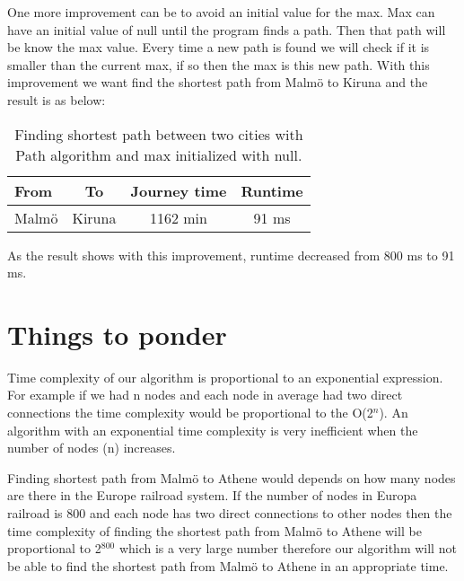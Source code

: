 \documentclass[a4paper,11pt]{article}
\begin{document}
One more improvement can be to avoid an initial value for the max. Max can have an initial value of null until the program finds a path. Then that path will be know the max value. Every time a new path is found we will check if it is smaller than the current max, if so then the max is this new path. With this improvement we want find the shortest path from Malmö to Kiruna and the result is as below:\newline

 \begin{table}[h]
\begin{center}
\begin{tabular}{l|c|c|c}
\textbf{From} & \textbf{To} & \textbf{Journey time} & \textbf{Runtime}\\
\hline
Malmö  &Kiruna &1162 min &91 ms \\
\end{tabular}
\caption{Finding shortest path between two cities with Path algorithm and max initialized with null.}
\label{tab:table1}
\end{center}
\end{table}\newlin

As the result shows with this improvement, runtime decreased from 800 ms to 91 ms.


\section*{Things to ponder}
Time complexity of our algorithm is proportional to an exponential expression. For example if we had n nodes and each node in average had two direct connections the time complexity would be proportional to the O(2$^n$). An algorithm with an exponential time complexity is very inefficient when the number of nodes (n) increases.\newline

Finding shortest path from Malmö to Athene would depends on how many nodes are there in the Europe railroad system. If the number of nodes in Europa railroad is 800 and each node has two direct connections to other nodes then the time complexity of finding the shortest path from Malmö to Athene will be proportional to 2$^{800}$ which is a very large number therefore our algorithm will not be able to find the shortest path from Malmö to Athene in an appropriate time. 
\end{document}
